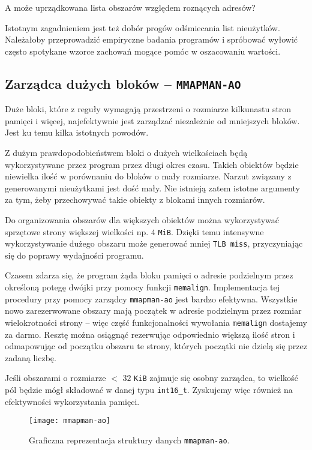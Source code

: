 \documentclass[12pt,a4paper,titlepage,twoside]{mwart}
\begin{document}
A może uprządkowana lista obszarów względem roznących adresów?

Istotnym zagadnieniem jest też dobór progów odśmiecania list nieużytków.
Należałoby przeprowadzić empiryczne badania programów i spróbować wyłowić
często spotykane wzorce zachowań mogące pomóc w oszacowaniu wartości.

\newpage

\subsection{Zarządca dużych bloków -- \texttt{MMAPMAN-AO}}

Duże bloki, które z reguły wymagają przestrzeni o rozmiarze kilkunastu stron
pamięci i więcej, najefektywnie jest zarządzać niezależnie od mniejszych
bloków. Jest ku temu kilka istotnych powodów.

Z dużym prawdopodobieństwem bloki o dużych wielkościach będą wykorzystywane
przez program przez długi okres czasu. Takich obiektów będzie niewielka ilość w
porównaniu do bloków o mały rozmiarze. Narzut związany z generowanymi
nieużytkami jest dość mały. Nie istnieją zatem istotne argumenty za tym, żeby
przechowywać takie obiekty z blokami innych rozmiarów.

Do organizowania obszarów dla większych obiektów można wykorzystywać sprzętowe
strony większej wielkości np. $4$ \verb+MiB+. Dzięki temu intensywne
wykorzystywanie dużego obszaru może generować mniej \texttt{TLB miss},
przyczyniając się do poprawy wydajności programu.

Czasem zdarza się, że program żąda bloku pamięci o adresie podzielnym przez
określoną potegę dwójki przy pomocy funkcji \verb+memalign+. Implementacja tej
procedury przy pomocy zarządcy \texttt{mmapman-ao} jest bardzo efektywna.
Wszystkie nowo zarezerwowane obszary mają początek w adresie podzielnym przez
rozmiar wielokrotności strony -- więc część funkcjonalności wywołania
\verb+memalign+ dostajemy za darmo. Resztę można osiągnąć rezerwując
odpowiednio większą ilość stron i odmapowując od początku obszaru te strony,
których początki nie dzielą się przez zadaną liczbę.

Jeśli obszarami o rozmiarze $<$ $32$ \verb+KiB+ zajmuje się osobny zarządca, to
wielkość pól będzie mógł składować w danej typu \verb+int16_t+. Zyskujemy więc
również na efektywności wykorzystania pamięci.

\begin{figure}[h]
\centering
\texttt{[image: mmapman-ao]}
\caption{Graficzna reprezentacja struktury danych \texttt{mmapman-ao}.}
\end{figure}
\end{document}

